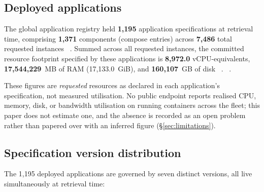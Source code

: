 \subsection{Deployed applications}
\label{sec:deployed-today-apps}

The global application registry held \textbf{1,195} application specifications at retrieval time,
comprising \textbf{1,371} components (compose entries) across \textbf{7,486} total requested
instances \shipped\ .
Summed across all requested instances, the committed resource footprint specified by these
applications is \textbf{8,972.0} vCPU-equivalents, \textbf{17,544,229}~MB of RAM (17,133.0~GiB),
and \textbf{160,107}~GB of disk
\shipped\ . 
\shipped\ .

These figures are \emph{requested} resources as declared in each application's specification, not
measured utilisation. No public endpoint reports realised CPU, memory, disk, or bandwidth
utilisation on running containers across the fleet; this paper does not estimate one, and the
absence is recorded as an open problem rather than papered over with an inferred figure
(\S\ref{sec:limitations}).

\subsection{Specification version distribution}
\label{sec:deployed-today-specversions}

The 1,195 deployed applications are governed by seven distinct \appspec versions, all live
simultaneously at retrieval time:

